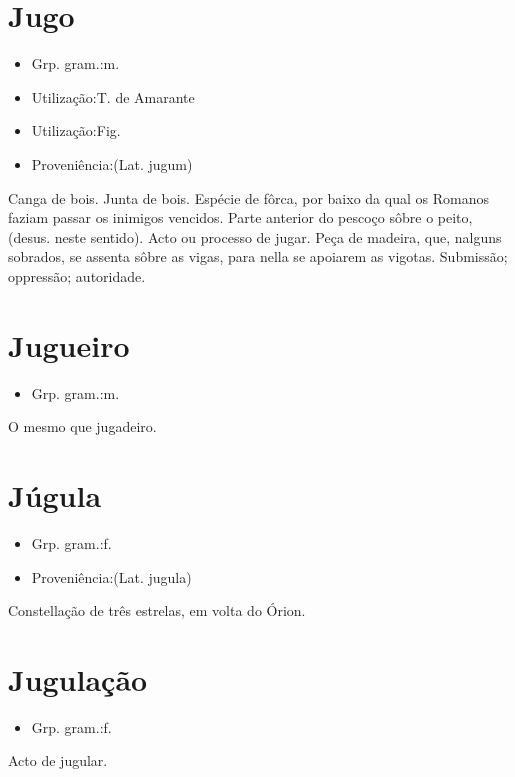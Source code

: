 \documentclass{article}
\begin{document}
\section{Jugo}
\begin{itemize}
\item {Grp. gram.:m.}
\end{itemize}
\begin{itemize}
\item {Utilização:T. de Amarante}
\end{itemize}
\begin{itemize}
\item {Utilização:Fig.}
\end{itemize}
\begin{itemize}
\item {Proveniência:(Lat. \textunderscore jugum\textunderscore )}
\end{itemize}
Canga de bois.
Junta de bois.
Espécie de fôrca, por baixo da qual os Romanos faziam passar os inimigos vencidos.
Parte anterior do pescoço sôbre o peito, (desus. neste sentido).
Acto ou processo de jugar.
Peça de madeira, que, nalguns sobrados, se assenta sôbre as vigas, para nella se apoiarem as vigotas.
Submissão; oppressão; autoridade.
\section{Jugueiro}
\begin{itemize}
\item {Grp. gram.:m.}
\end{itemize}
O mesmo que \textunderscore jugadeiro\textunderscore .
\section{Júgula}
\begin{itemize}
\item {Grp. gram.:f.}
\end{itemize}
\begin{itemize}
\item {Proveniência:(Lat. \textunderscore jugula\textunderscore )}
\end{itemize}
Constellação de três estrelas, em volta do Órion.
\section{Jugulação}
\begin{itemize}
\item {Grp. gram.:f.}
\end{itemize}
Acto de jugular.
\end{document}

